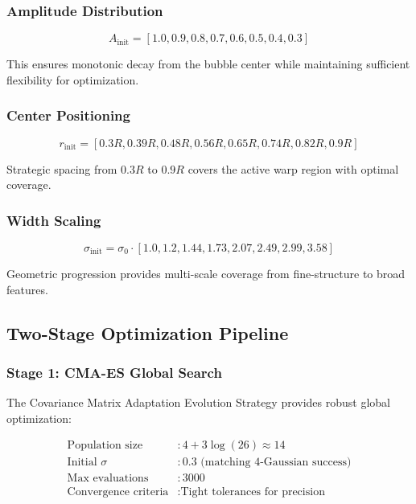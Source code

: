 \documentclass[11pt,a4paper]{article}
\begin{document}
\subsubsection{Amplitude Distribution}
\begin{equation}
A_{\text{init}} = [1.0, 0.9, 0.8, 0.7, 0.6, 0.5, 0.4, 0.3]
\end{equation}

This ensures monotonic decay from the bubble center while maintaining sufficient flexibility for optimization.

\subsubsection{Center Positioning}
\begin{equation}
r_{\text{init}} = [0.3R, 0.39R, 0.48R, 0.56R, 0.65R, 0.74R, 0.82R, 0.9R]
\end{equation}

Strategic spacing from $0.3R$ to $0.9R$ covers the active warp region with optimal coverage.

\subsubsection{Width Scaling}
\begin{equation}
\sigma_{\text{init}} = \sigma_0 \cdot [1.0, 1.2, 1.44, 1.73, 2.07, 2.49, 2.99, 3.58]
\end{equation}

Geometric progression provides multi-scale coverage from fine-structure to broad features.

\subsection{Two-Stage Optimization Pipeline}

\subsubsection{Stage 1: CMA-ES Global Search}

The Covariance Matrix Adaptation Evolution Strategy provides robust global optimization:

\begin{align}
\text{Population size} &: 4 + 3\log(26) \approx 14 \\
\text{Initial $\sigma$} &: 0.3 \text{ (matching 4-Gaussian success)} \\
\text{Max evaluations} &: 3000 \\
\text{Convergence criteria} &: \text{Tight tolerances for precision}
\end{align}
\end{document}
